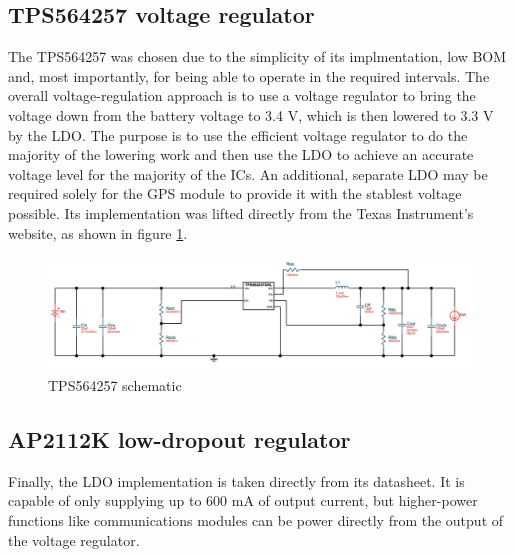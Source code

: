 \documentclass{article}
\begin{document}
\subsection{TPS564257 voltage regulator}

The TPS564257 was chosen due to the simplicity of its implmentation, low BOM and, most importantly, for being able to operate in the required intervals. The overall voltage-regulation approach is to use a voltage regulator to bring the voltage down from the battery voltage to 3.4 V, which is then lowered to 3.3 V by the LDO. The purpose is to use the efficient voltage regulator to do the majority of the lowering work and then use the LDO to achieve an accurate voltage level for the majority of the ICs. An additional, separate LDO may be required solely for the GPS module to provide it with the stablest voltage possible. Its implementation was lifted directly from the Texas Instrument's website, as shown in figure \ref{fig:mesh4}.

\begin{figure}[h]
	\centering
   	 \includegraphics[width=\linewidth]{TPS564257-schematic}
	\caption{TPS564257 schematic}
	\label{fig:mesh4}
\end{figure}

\subsection{AP2112K low-dropout regulator}

Finally, the LDO implementation is taken directly from its datasheet. It is capable of only supplying up to 600 mA of output current, but higher-power functions like communications modules can be power directly from the output of the voltage regulator.
\end{document}
